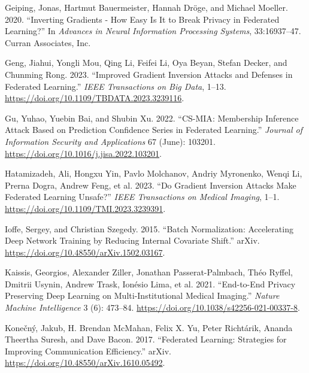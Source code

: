 \begin{CSLReferences}{1}{0}
\leavevmode{}%
Geiping, Jonas, Hartmut Bauermeister, Hannah Dröge, and Michael Moeller.
2020. {``Inverting {Gradients} - {How} Easy Is It to Break Privacy in
Federated Learning?''} In \emph{Advances in {Neural Information
Processing Systems}}, 33:16937--47. {Curran Associates, Inc.}

\leavevmode{}%
Geng, Jiahui, Yongli Mou, Qing Li, Feifei Li, Oya Beyan, Stefan Decker,
and Chunming Rong. 2023. {``Improved {Gradient Inversion Attacks} and
{Defenses} in {Federated Learning}.''} \emph{IEEE Transactions on Big
Data}, 1--13. \url{https://doi.org/10.1109/TBDATA.2023.3239116}.

\leavevmode{}%
Gu, Yuhao, Yuebin Bai, and Shubin Xu. 2022. {``{CS-MIA}: {Membership}
Inference Attack Based on Prediction Confidence Series in Federated
Learning.''} \emph{Journal of Information Security and Applications} 67
(June): 103201. \url{https://doi.org/10.1016/j.jisa.2022.103201}.

\leavevmode{}%
Hatamizadeh, Ali, Hongxu Yin, Pavlo Molchanov, Andriy Myronenko, Wenqi
Li, Prerna Dogra, Andrew Feng, et al. 2023. {``Do {Gradient Inversion
Attacks Make Federated Learning Unsafe}?''} \emph{IEEE Transactions on
Medical Imaging}, 1--1. \url{https://doi.org/10.1109/TMI.2023.3239391}.

\leavevmode{}%
Ioffe, Sergey, and Christian Szegedy. 2015. {``Batch {Normalization}:
{Accelerating Deep Network Training} by {Reducing Internal Covariate
Shift}.''} {arXiv}. \url{https://doi.org/10.48550/arXiv.1502.03167}.

\leavevmode{}%
Kaissis, Georgios, Alexander Ziller, Jonathan Passerat-Palmbach, Théo
Ryffel, Dmitrii Usynin, Andrew Trask, Ionésio Lima, et al. 2021.
{``End-to-End Privacy Preserving Deep Learning on Multi-Institutional
Medical Imaging.''} \emph{Nature Machine Intelligence} 3 (6): 473--84.
\url{https://doi.org/10.1038/s42256-021-00337-8}.

\leavevmode{}%
Konečný, Jakub, H. Brendan McMahan, Felix X. Yu, Peter Richtárik, Ananda
Theertha Suresh, and Dave Bacon. 2017. {``Federated {Learning}:
{Strategies} for {Improving Communication Efficiency}.''} {arXiv}.
\url{https://doi.org/10.48550/arXiv.1610.05492}.


\end{CSLReferences}
